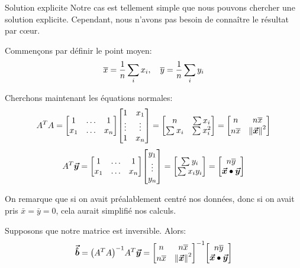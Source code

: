 \documentclass[a4paper]{article}
\begin{document}
\begin{parag}{Solution explicite}
    Notre cas est tellement simple que nous pouvons chercher une solution explicite. Cependant, nous n'avons pas besoin de connaître le résultat par cœur.

    Commençons par définir le point moyen:
    \[\overline{x} = \frac{1}{n} \sum_{i}^{} x_i, \quad \overline{y} = \frac{1}{n} \sum_{i}^{} y_i\]

    Cherchons maintenant les équations normales:
    \[A^T A = \begin{bmatrix} 1 & \ldots & 1 \\ x_1 & \ldots & x_n \end{bmatrix} \begin{bmatrix} 1 & x_1 \\ \vdots & \vdots \\ 1 & x_n \end{bmatrix} = \begin{bmatrix} n & \sum x_i \\ \sum_{}^{} x_i & \sum_{}^{} x_i^2 \end{bmatrix} = \begin{bmatrix} n & n \bar{x} \\ n \bar{x} & \left\|\bvec{x}\right\|^2 \end{bmatrix} \]
    \[A^T \bvec{y} = \begin{bmatrix} 1 & \ldots & 1 \\ x_1 & \ldots & x_n \end{bmatrix} \begin{bmatrix} y_1 \\ \vdots \\ y_n \end{bmatrix} = \begin{bmatrix} \sum_{}^{} y_i \\ \sum_{}^{} x_i y_i \end{bmatrix} = \begin{bmatrix} n \bar{y} \\ \bvec{x} \dotprod \bvec{y} \end{bmatrix} \]

    On remarque que si on avait préalablement centré nos données, donc si on avait pris $\bar{x} = \bar{y} = 0$, cela aurait simplifié nos calculs.

    Supposons que notre matrice est inversible. Alors:
    \[\bvec{\hat{b}} = \left(A^T A\right)^{-1} A^T \bvec{y} = \begin{bmatrix} n & n \bar{x} \\ n \bar{x} & \left\|\bvec{x}\right\|^2 \end{bmatrix}^{-1} \begin{bmatrix} n \bar{y} \\ \bvec{x} \dotprod \bvec{y} \end{bmatrix}\]


\end{parag}
\end{document}
